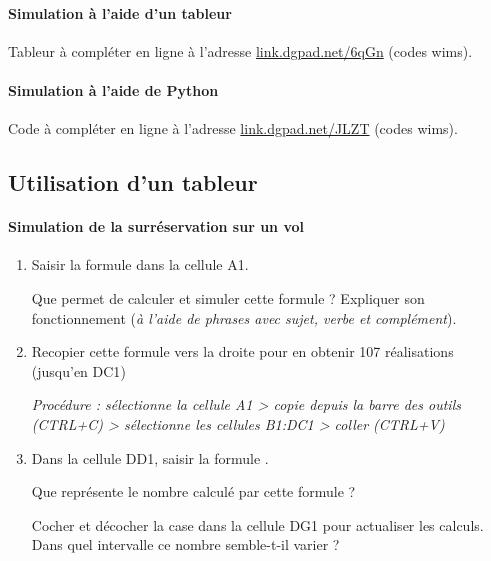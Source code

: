 \documentclass[main.tex]{subfiles}
\begin{document}
\paragraph{Simulation à l'aide d'un tableur} Tableur à compléter en ligne à l'adresse \href{https://link.dgpad.net/6qGn}{link.dgpad.net/6qGn} (codes wims). 

\paragraph{Simulation à l'aide de Python} Code à compléter en ligne à l'adresse \href{https://link.dgpad.net/JLZT}{link.dgpad.net/JLZT} (codes wims). 
\newpage

\subsection{Utilisation d'un tableur}
\paragraph{Simulation de la surréservation sur un vol}
\begin{enumerate}[label=\alph*),leftmargin=*]
	\item Saisir la formule  \fg dans la cellule {\helvbx  A1}.
	
	Que permet de calculer et simuler cette formule ? Expliquer son fonctionnement (\emph{à l'aide de phrases avec sujet, verbe et complément}).
	\item Recopier cette formule vers la droite pour en obtenir 107 réalisations (jusqu'en {\helvbx DC1})
	
	\emph{Procédure : sélectionne la cellule  { \helvbx A1}    > copie depuis la barre des outils (CTRL+C) > sélectionne les cellules { \helvbx B1:DC1} > coller (CTRL+V)}
		
	\item Dans la cellule {\helvbx DD1}, saisir la formule \fg.
	
	Que représente le nombre calculé par cette formule ?  
	
	Cocher et décocher la case dans la cellule {\helvbx DG1} pour actualiser les calculs. Dans quel intervalle ce nombre semble-t-il varier ?
	
\end{enumerate}
\end{document}
